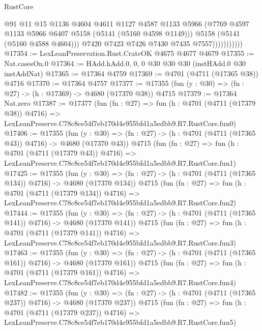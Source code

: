 \begin{lexlean}{RustCore}
\begin{coremodule}
                            @91
                            @11
                            @15
                            @1136
                            @4604
                            @4611
                            @1127
                            @4587
                            @1133
                            @5966
                            (@7769 @4597 @1133 @5966 @6407 @5158 (@5141 (@5160 @4598 @1149)))
                            @5158
                            (@5141 (@5160 @4588 @4604)))
                          @7420
                          @7423
                          @7426
                          @7430
                          @7435
                          @7557)))))))))))
@17354 := LexLeanPreservation.Rust.CrateOK @4675 @4677 @4679
@17355 := Nat.casesOn.{0}
@17364 := HAdd.hAdd.{0, 0, 0} @30 @30 @30 (instHAdd.{0} @30 instAddNat)
@17365 := @17364 @4759
@17369 := @4701 (@4711 (@17365 @38)) @4716
@17370 := @17364 @4757
@17377 := @17355 (fun (y : @30) => (fn : @27) -> (h : @17369) -> @4680 (@17370 @38)) @4715
@17379 := @17364 Nat.zero
@17387 := @17377
    (fun (fn : @27) =>
    fun (h : @4701 (@4711 (@17379 @38)) @4716) =>
    LexLeanPreserve.C78c8ce54f7eb170d4e955bfd1a5edbb9.R7.RustCore.fun0)
@17406 := @17355
    (fun (y : @30) => (fn : @27) -> (h : @4701 (@4711 (@17365 @43)) @4716) -> @4680 (@17370 @43))
    @4715
    (fun (fn : @27) =>
    fun (h : @4701 (@4711 (@17379 @43)) @4716) =>
    LexLeanPreserve.C78c8ce54f7eb170d4e955bfd1a5edbb9.R7.RustCore.fun1)
@17425 := @17355
    (fun (y : @30) => (fn : @27) -> (h : @4701 (@4711 (@17365 @134)) @4716) -> @4680 (@17370 @134))
    @4715
    (fun (fn : @27) =>
    fun (h : @4701 (@4711 (@17379 @134)) @4716) =>
    LexLeanPreserve.C78c8ce54f7eb170d4e955bfd1a5edbb9.R7.RustCore.fun2)
@17444 := @17355
    (fun (y : @30) => (fn : @27) -> (h : @4701 (@4711 (@17365 @141)) @4716) -> @4680 (@17370 @141))
    @4715
    (fun (fn : @27) =>
    fun (h : @4701 (@4711 (@17379 @141)) @4716) =>
    LexLeanPreserve.C78c8ce54f7eb170d4e955bfd1a5edbb9.R7.RustCore.fun3)
@17463 := @17355
    (fun (y : @30) => (fn : @27) -> (h : @4701 (@4711 (@17365 @161)) @4716) -> @4680 (@17370 @161))
    @4715
    (fun (fn : @27) =>
    fun (h : @4701 (@4711 (@17379 @161)) @4716) =>
    LexLeanPreserve.C78c8ce54f7eb170d4e955bfd1a5edbb9.R7.RustCore.fun4)
@17482 := @17355
    (fun (y : @30) => (fn : @27) -> (h : @4701 (@4711 (@17365 @237)) @4716) -> @4680 (@17370 @237))
    @4715
    (fun (fn : @27) =>
    fun (h : @4701 (@4711 (@17379 @237)) @4716) =>
    LexLeanPreserve.C78c8ce54f7eb170d4e955bfd1a5edbb9.R7.RustCore.fun5)

\end{coremodule}
\end{lexlean}
